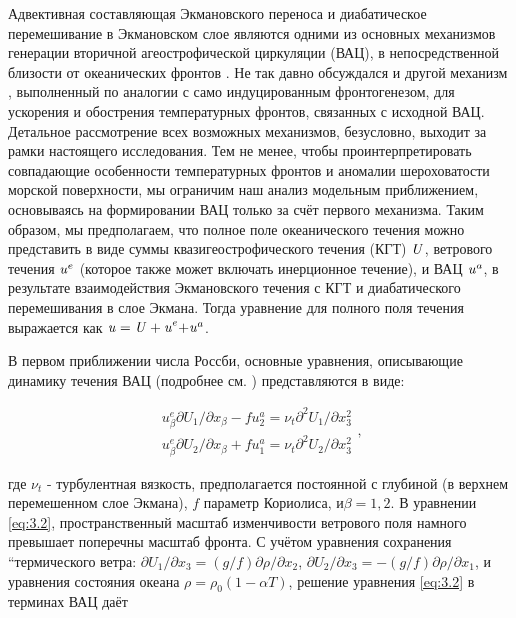 Адвективная составляющая Экмановского переноса и диабатическое перемешивание в Экмановском слое являются одними из основных механизмов генерации вторичной агеострофической циркуляции (ВАЦ), в непосредственной близости от океанических фронтов \citep{Klein1990,Garrett1981,Thompson2000,Nagai2006}. Не так давно обсуждался и другой механизм \citep{McWilliams2009}, выполненный по аналогии с само индуцированным фронтогенезом, для ускорения и обострения температурных фронтов, связанных с исходной ВАЦ. Детальное рассмотрение всех возможных механизмов, безусловно, выходит за рамки настоящего исследования. Тем не менее, чтобы проинтерпретировать совпадающие особенности температурных фронтов и аномалии шероховатости морской поверхности, мы ограничим наш анализ модельным приближением, основываясь на формировании ВАЦ только за счёт первого механизма. Таким образом, мы предполагаем, что полное поле океанического течения можно представить в виде суммы квазигеострофического течения (КГТ) ${\it U}$, ветрового течения ${\it u}^{e} $ (которое также может включать инерционное течение), и ВАЦ ${\it u}^{a} $, в результате взаимодействия Экмановского течения с КГТ и диабатического перемешивания в слое Экмана. Тогда уравнение для полного поля течения выражается как ${\it u=U+u}^{e} {\it +u}^{a} $.

В первом приближении числа Россби, основные уравнения, описывающие динамику течения ВАЦ (подробнее см. \citep{Klein1990,Garrett1981,Thompson2000,Nagai2006}) представляются в виде:



\begin{equation} \label{eq:3.2} \begin{array}{l} {u_{\beta }^{e} \partial U_{1} /\partial x_{\beta } -fu_{2}^{a} =\nu _{t} \partial ^{2} U_{1} /\partial x_{3}^{2} } \\ {u_{\beta }^{e} \partial U_{2} /\partial x_{\beta } +fu_{1}^{a} =\nu _{t} \partial ^{2} U_{2} /\partial x_{3}^{2} } \end{array},  \end{equation} 



\noindent где $\nu _{t} $ - турбулентная вязкость, предполагается постоянной с глубиной (в верхнем перемешенном слое Экмана), $f$ параметр Кориолиса, и$\beta =1,2$. В уравнении \eqref{eq:3.2}, пространственный масштаб изменчивости ветрового поля намного превышает поперечны масштаб фронта. С учётом уравнения сохранения ``термического ветра: $\partial U_{1} /\partial x_{3} =(g/f)\partial \rho /\partial x_{2} $, $\partial U_{2} /\partial x_{3} =-(g/f)\partial \rho /\partial x_{1} $, и уравнения состояния океана $\rho =\rho _{0} (1-\alpha T)$, решение уравнения \eqref{eq:3.2} в терминах ВАЦ даёт



